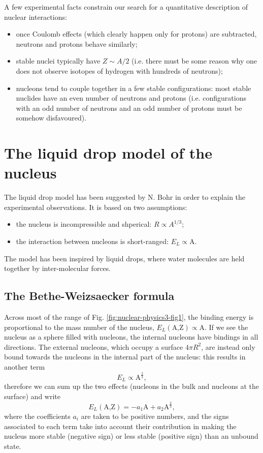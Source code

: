 A few experimental facts constrain our search for a quantitative description of nuclear interactions:
\begin{itemize}
    \item once Coulomb effects (which clearly happen only for protons) are subtracted, neutrons and protons behave similarly;
    \item stable nuclei typically have \(Z\sim A/2\) (i.e. there must be some reason why one does not observe isotopes of hydrogen with hundreds of neutrons);
    \item nucleons tend to couple together in a few stable configurations: most stable nuclides have an even number of neutrons and protons (i.e. configurations with an odd number of neutrons and an odd number of protons must be somehow disfavoured).
\end{itemize}

\section{The liquid drop model of the nucleus}
The liquid drop model has been suggested by N. Bohr in order to explain the experimental observations. It is based on two assumptions:
\begin{itemize}
    \item the nucleus is incompressible and shperical: $R \propto {A}^{1/3}$;
    \item the interaction between nucleons is short-ranged: $E_L \propto \mbox{A}$.
\end{itemize}
The model has been inspired by  liquid drops, where water molecules are held together by inter-molecular forces.

\subsection{The Bethe-Weizsaecker formula}
Across most of the range of Fig. \ref{fig:nuclear-physics3-fig1}, the binding energy is proportional to the mass number of the nucleus, $E_L(\mbox{A,Z}) \propto \mbox{A}$. If we see the nucleus as a sphere filled with nucleons, the internal nucleons have bindings in all directions. The external nucleons, which occupy a surface \(4\pi R^2\), are instead only bound towards the nucleons in the internal part of the nucleus: this results in another term
\begin{equation*}
    E_L \propto \mbox{A}^{\frac{2}{3}},
\end{equation*}
therefore we can sum up the two effects (nucleons in the bulk and nucleons at the surface) and write
\begin{equation*}
    E_L(\mbox{A,Z}) = -a_1\mbox{A} + a_2\mbox{A}^{\frac{2}{3}},
\end{equation*}
where the coefficients \(a_i\) are taken to be positive numbers, and the signs associated to each term take into account their contribution in making the nucleus more stable (negative sign) or less stable (positive sign) than an unbound state.

